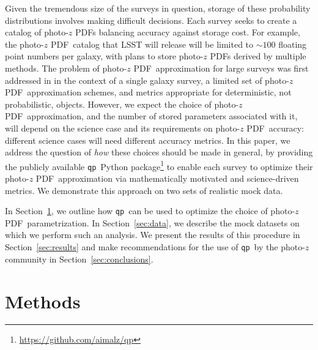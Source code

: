 \documentclass[\docopts]{\docclass}
\newcommand{\qp}{\texttt{qp}}
\newcommand{\pz}{photo-$z$ PDF}
\begin{document}
Given the tremendous size of the surveys in question, storage of these 
probability distributions involves making difficult decisions.
Each survey seeks to create a catalog of \pz s balancing accuracy against 
storage cost.
For example, the \pz\ catalog that LSST will release will be limited to 
$\sim100$ floating point numbers per galaxy\citet[section 
4.2.2]{juric_data_2017}, with plans to store \pz s derived by multiple methods.
The problem of \pz\ approximation for large surveys was first addressed in 
\citet{carrasco_kind_sparse_2014} in the context of a single galaxy survey, a 
limited set of \pz\ approximation schemes, and metrics appropriate for 
deterministic, not probabilistic, objects.
However, we expect the choice of \pz\ approximation, and the number of stored 
parameters associated with it, will depend on the science case and its 
requirements on \pz\ accuracy: different science cases will need different 
accuracy metrics.
In this paper, we address the question of \textit{how} these choices should be 
made in general, by providing the publicly available \qp\ Python 
package\footnote{\url{https://github.com/aimalz/qp}} to enable each survey to 
optimize their \pz\ approximation via mathematically motivated and 
science-driven metrics.
We demonstrate this approach on two sets of realistic mock data.

In Section~\ref{sec:methods}, we outline how \qp\ can be used to optimize the 
choice of \pz\ parametrization.
In Section~\ref{sec:data}, we describe the mock datasets on which we perform 
such an analysis.
We present the results of this procedure in Section~\ref{sec:results} and make 
recommendations for the use of \qp\ by the photo-$z$ community in 
Section~\ref{sec:conclusions}.








\section{Methods}
\label{sec:methods}
\end{document}
